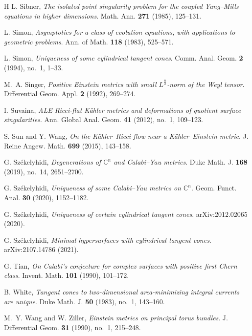\documentclass[11pt,reqno]{amsart}
\numberwithin{equation}{section}
\theoremstyle{definition}
\theoremstyle{remark}
\begin{document}
\begin{thebibliography}{H}
L. Sibner,
\textit{The isolated point singularity problem for the coupled Yang--Mills equations in higher dimensions}.
Math. Ann. \textbf{271} (1985), 125--131.

L. Simon,
\textit{Asymptotics for a class of evolution equations, with applications to geometric problems}.
Ann. of Math. \textbf{118} (1983), 525--571.

L. Simon,
\textit{Uniqueness of some cylindrical tangent cones}.
Comm. Anal. Geom. \textbf{2} (1994), no.~1, 1--33.

M.~A. Singer,
\textit{Positive Einstein metrics with small $L^{\frac{n}{2}}$-norm of the Weyl tensor}.
Differential Geom. Appl. \textbf{2} (1992), 269--274.

I. Suvaina,
\textit{ALE Ricci-flat Kähler metrics and deformations of quotient surface singularities}.
Ann. Global Anal. Geom. \textbf{41} (2012), no.~1, 109--123.

S. Sun and Y. Wang,
\textit{On the Kähler--Ricci flow near a Kähler--Einstein metric}.
J. Reine Angew. Math. \textbf{699} (2015), 143--158.

G. Székelyhidi,
\textit{Degenerations of $\mathbb{C}^n$ and Calabi--Yau metrics}.
Duke Math. J. \textbf{168} (2019), no.~14, 2651--2700.


G. Székelyhidi,
\textit{Uniqueness of some Calabi--Yau metrics on $\mathbb{C}^n$}.
Geom. Funct. Anal. \textbf{30} (2020), 1152--1182.


G. Székelyhidi,
\textit{Uniqueness of certain cylindrical tangent cones}.
arXiv:2012.02065 (2020).

G. Székelyhidi,
\textit{Minimal hypersurfaces with cylindrical tangent cones}.
arXiv:2107.14786 (2021).

G. Tian,
\textit{On Calabi’s conjecture for complex surfaces with positive first Chern class}.
Invent. Math. \textbf{101} (1990), 101--172.

B. White,
\textit{Tangent cones to two-dimensional area-minimizing integral currents are unique}.
Duke Math. J. \textbf{50} (1983), no.~1, 143--160.

M.~Y. Wang and W. Ziller,
\textit{Einstein metrics on principal torus bundles}.
J. Differential Geom. \textbf{31} (1990), no.~1, 215--248.


\end{thebibliography}
\end{document}
